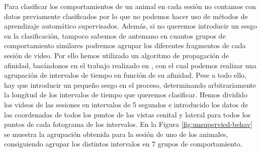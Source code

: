 Para clasificar los comportamientos de un animal en cada sesión no contamos con datos previamente clasificados por lo que no podemos hacer uso de métodos de aprendizaje automático supervisados. Además, si no queremos introducir un sesgo en la clasificación, tampoco sabemos de antemano en cuantos grupos de comportamiento similares podremos agrupar los diferentes fragmentos de cada sesión de video. Por ello hemos utilizado un algoritmo de propagación de afinidad, basándonos en el trabajo realizado en \cite{neuron}, con el cual podemos realizar una agrupación de intervalos de tiempo en función de su afinidad. Pese a todo ello, hay que introducir un pequeño sesgo en el proceso, determinando arbitrariamente la longitud de los intervalos de tiempo que queremos clasificar. Hemos dividido los videos de las sesiones en intervalos de 5 segundos e introducido los datos de las coordenadas de todos los puntos de las vistas cenital y lateral para todos los puntos de cada fotograma de los intervalos. En la Figura \ref{fig:unsupervied-behav} se muestra la agrupación obtenida para la sesión de uno de los animales, consiguiendo agrupar los distintos intervalos en 7 grupos de comportamiento.

